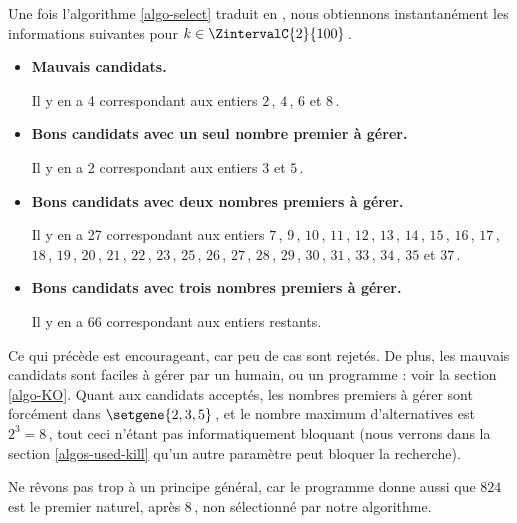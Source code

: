

\medskip

Une fois l'algorithme \ref{algo-select} traduit en \python, nous obtiennons instantanément les informations suivantes pour $k \in \ZintervalC{2}{100}$\,.
%
\begin{itemize}
	\item \textbf{Mauvais candidats.}
	
	\noindent
	Il y en a 4 correspondant aux entiers $2$\,, $4$\,, $6$ et $8$\,.
	
	\item \textbf{Bons candidats avec un seul nombre premier à gérer.}
	
	\noindent
	Il y en a 2 correspondant aux entiers $3$ et $5$\,.
	
	\item \textbf{Bons candidats avec deux nombres premiers à gérer.}
	
	\noindent
	Il y en a 27 correspondant aux entiers $7$\,, $9$\,, $10$\,, $11$\,, $12$\,, $13$\,, $14$\,, $15$\,, $16$\,, $17$\,, $18$\,, $19$\,, $20$\,, $21$\,, $22$\,, $23$\,, $25$\,, $26$\,, $27$\,, $28$\,, $29$\,, $30$\,, $31$\,, $33$\,, $34$\,, $35$ et $37$\,.

	\item\textbf{Bons candidats avec trois nombres premiers à gérer.}
	
	\noindent
	Il y en a 66 correspondant aux entiers restants.
\end{itemize}


Ce qui précède est encourageant, car peu de cas sont rejetés.
De plus, les mauvais candidats sont faciles à gérer par un humain, ou un programme : voir la section \ref{algo-KO}.
Quant aux candidats acceptés, les nombres premiers à gérer sont forcément dans $\setgene{2, 3, 5}$\,, et le nombre maximum d'alternatives est $2^3 = 8$\,, tout ceci n'étant pas informatiquement bloquant (nous verrons dans la section \ref{algos-used-kill} qu'un autre paramètre peut bloquer la recherche).
 



\begin{remark}
	Ne rêvons pas trop à un principe général, car le programme donne aussi que $824$ est le premier naturel, après $8$\,, non sélectionné par notre algorithme.
\end{remark}